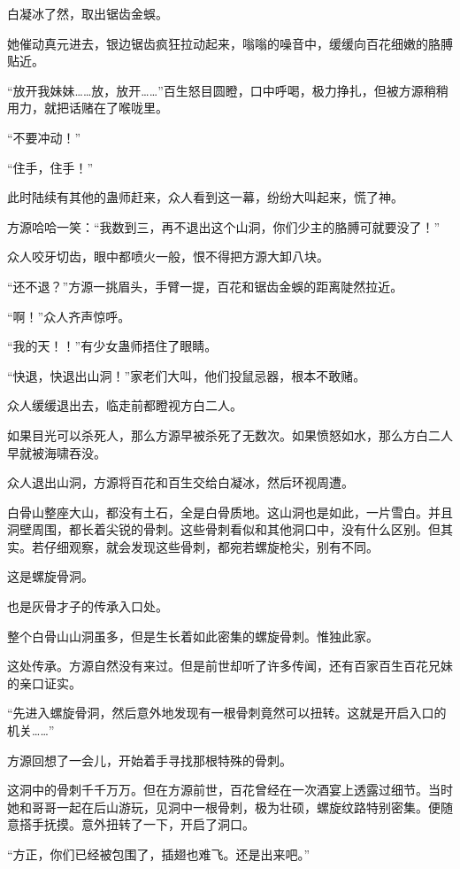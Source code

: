 \begin{this_body}
白凝冰了然，取出锯齿金蜈。

她催动真元进去，银边锯齿疯狂拉动起来，嗡嗡的噪音中，缓缓向百花细嫩的胳膊贴近。

“放开我妹妹……放，放开……”百生怒目圆瞪，口中呼喝，极力挣扎，但被方源稍稍用力，就把话赌在了喉咙里。

“不要冲动！”

“住手，住手！”

此时陆续有其他的蛊师赶来，众人看到这一幕，纷纷大叫起来，慌了神。

方源哈哈一笑：“我数到三，再不退出这个山洞，你们少主的胳膊可就要没了！”

众人咬牙切齿，眼中都喷火一般，恨不得把方源大卸八块。

“还不退？”方源一挑眉头，手臂一提，百花和锯齿金蜈的距离陡然拉近。

“啊！”众人齐声惊呼。

“我的天！！”有少女蛊师捂住了眼睛。

“快退，快退出山洞！”家老们大叫，他们投鼠忌器，根本不敢赌。

众人缓缓退出去，临走前都瞪视方白二人。

如果目光可以杀死人，那么方源早被杀死了无数次。如果愤怒如水，那么方白二人早就被海啸吞没。

众人退出山洞，方源将百花和百生交给白凝冰，然后环视周遭。

白骨山整座大山，都没有土石，全是白骨质地。这山洞也是如此，一片雪白。并且洞壁周围，都长着尖锐的骨刺。这些骨刺看似和其他洞口中，没有什么区别。但其实。若仔细观察，就会发现这些骨刺，都宛若螺旋枪尖，别有不同。

这是螺旋骨洞。

也是灰骨才子的传承入口处。

整个白骨山山洞虽多，但是生长着如此密集的螺旋骨刺。惟独此家。

这处传承。方源自然没有来过。但是前世却听了许多传闻，还有百家百生百花兄妹的亲口证实。

“先进入螺旋骨洞，然后意外地发现有一根骨刺竟然可以扭转。这就是开启入口的机关……”

方源回想了一会儿，开始着手寻找那根特殊的骨刺。

这洞中的骨刺千千万万。但在方源前世，百花曾经在一次酒宴上透露过细节。当时她和哥哥一起在后山游玩，见洞中一根骨刺，极为壮硕，螺旋纹路特别密集。便随意搭手抚摸。意外扭转了一下，开启了洞口。

“方正，你们已经被包围了，插翅也难飞。还是出来吧。”


\end{this_body}

